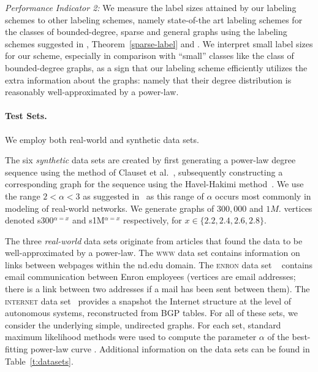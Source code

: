 \emph{Performance Indicator 2:} We  measure the label sizes attained by our labeling schemes to other labeling schemes, namely state-of-the art labeling schemes for the classes of bounded-degree, sparse and general graphs using the  labeling schemes suggested in \cite{adjiashvili2014labeling},  Theorem~\ref{sparse-label} and \cite{alstrup2014adjacency}. We interpret small label sizes for our scheme, especially in comparison with ``small'' classes like the class of bounded-degree graphs, as a sign that our labeling scheme efficiently utilizes the extra information about the graphs: namely that their degree distribution is reasonably well-approximated by a power-law.
 

\paragraph{Test Sets.}
We employ both real-world and synthetic data sets. 

The six \emph{synthetic} data sets are created by first generating a power-law degree sequence using the method of Clauset et al.~\cite[App.\ D]{clauset2009power}, subsequently constructing a corresponding graph for the sequence using the Havel-Hakimi method~\cite{hakimi1962realizability}. 
We use the range $2< \alpha < 3$ as suggested in~\cite{clauset2009power} as this range of $\alpha$ occurs most commonly in modeling of real-world networks. We generate graphs of $300,000$ and $1M.$ vertices denoted  s300$^{\alpha=x}$  and s1M$^{\alpha=x}$  respectively, for $x \in \{2.2,2.4,2.6,2.8\}$. 


The three \emph{real-world} data sets originate  from articles that found the data to be well-approximated by a power-law. 
The \textsc{www} data set  \cite{albert1999internet} contains information on links between webpages within the nd.edu domain. 
The \textsc{enron} data set ~\cite{leskovec2009community}  contains email communication between  Enron employees (vertices are email addresses; there is a link between two addresses
if a mail has been sent between them).
The \textsc{internet} data set~\cite{newman} provides a snapshot the Internet structure at the level of  autonomous systems, reconstructed from BGP tables. 
For all of these sets, we consider the underlying simple, undirected graphs. For each set, standard maximum likelihood methods were used to compute the parameter
$\alpha$ of the best-fitting power-law curve \cite{clauset2009power}. Additional information on the data sets can be found in Table~\ref{t:datasets}.

